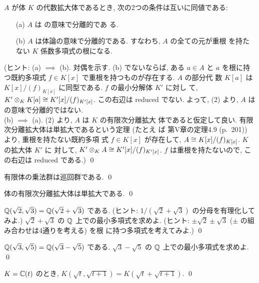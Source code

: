 \documentclass[12pt,twoside]{jarticle}
\begin{document}
\begin{question}
  $A$ が体 $K$ の代数拡大体であるとき, 次の2つの条件は互いに同値である:
  \begin{itemize}
  \item[(a)] $A$ は  の意味で分離的であ
    る.
  \item[(b)] $A$ は体論の意味で分離的である.  すなわち, $A$ の全ての元が重根
    を持たない $K$ 係数多項式の根になる. 
  \end{itemize}
  (ヒント:
  (a) $\implies$ (b).  対偶を示す.  (b) でないならば, ある $a\in A$ と $a$ 
  を根に持つ既約多項式 $f\in K[x]$ で重根を持つものが存在する.  $A$ の部分代
  数 $K[a]$ は $K[x]/(f)_{K[x]}$ に同型である.  $f$ の最小分解体 $K'$ に対し
  て, $K'\otimes_K K[a]\cong K'[x]/(f)_{K'[x]}$.  この右辺は reduced でない. 
  よって,   (2) より, 
  $A$ は  の意味で分離的ではない. \\
  (b) $\implies$ (a).   (2) より, $A$ は $K$ の有限次分離拡大
  体であると仮定して良い.  有限次分離拡大体は単拡大であるという定理 (たとえ
  ば \cite{morita} 第V章の定理4.9 (p.~201)) より, 重根を持たない既約多項
  式 $f\in K[x]$ が存在して, $A\cong K[x]/(f)_{K[x]}$.  $K$ の拡大体 $K'$ に
  対して, $K'\otimes_K A \cong K'[x]/(f)_{K'[x]}$.  $f$ は重根を持たないので, こ
  の右辺は reduced である.)
  \qed
\end{question}

\begin{question}
  有限体の乗法群は巡回群である.  \qed
\end{question}

\begin{question}
  体の有限次分離拡大体は単拡大である.  \qed
\end{question}

\begin{question}
  ${\mathbb Q}(\sqrt{2},\sqrt{3})={\mathbb Q}(\sqrt{2}+\sqrt{3})$ である.
  (ヒント: $1/(\sqrt{2}+\sqrt{3})$ の分母を有理化してみよ.)
  $\sqrt{2}+\sqrt{3}$ の ${\mathbb Q}$ 上での最小多項式を求めよ.
  (ヒント: $\pm\sqrt{2}\pm\sqrt{3}$ ($\pm$ の組み合わせは4通りを考える) を根
  に持つ多項式を考えてみよ.)
  \qed
\end{question}

\begin{question}
  ${\mathbb Q}(\sqrt{3},\sqrt{5})={\mathbb Q}(\sqrt{3}-\sqrt{5})$ である.
  $\sqrt{3}-\sqrt{5}$ の ${\mathbb Q}$ 上での最小多項式を求めよ. \qed
\end{question}

\begin{question}
  $K={\mathbb C}(t)$ のとき, $K(\sqrt{t}, \sqrt{t+1})=K(\sqrt{t}+\sqrt{t+1})$. \qed
\end{question}
\end{document}
